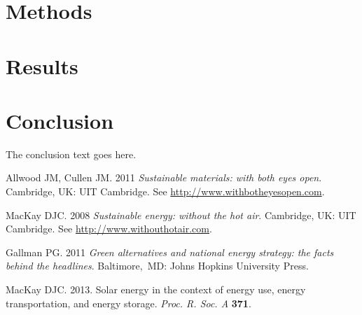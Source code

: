 \documentclass[nocrop,final,onecolumn,openacc]{bluetechreport}
\begin{document}
\section{Methods}
\lipsum[6-8]

\section{Results}
\lipsum[9-10]

\section{Conclusion}
The conclusion text goes here.\vskip6pt

\enlargethispage{20pt}









\begin{thebibliography}{9}

 Allwood JM, Cullen JM. 2011 \textit{Sustainable materials:  with both eyes open}.
Cambridge, UK: UIT Cambridge. See \href{http://www.withbotheyesopen.com}{http://www.withbotheyesopen.com}.

  MacKay DJC. 2008  \textit{Sustainable energy:  without the hot air}.
 Cambridge, UK: UIT Cambridge. See \href{http://www.withouthotair.com}{http://www.withouthotair.com}.

 Gallman PG. 2011  \textit{Green alternatives and national energy strategy: the facts
 behind the headlines}.  Baltimore,\ MD: Johns Hopkins University Press.

 MacKay DJC. 2013.  Solar energy in the context of energy use, energy transportation, and
 energy storage. \textit{Proc. R. Soc. A} \textbf{371}.

\end{thebibliography}
\end{document}

